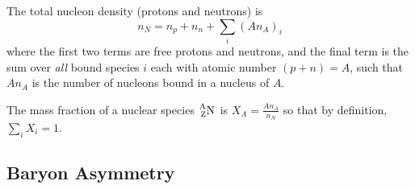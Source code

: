 \documentclass[a4paper,twoside,master.tex]{subfiles}
\begin{document}
The total nucleon density (protons and neutrons) is
\begin{equation}
    n_N = n_p + n_n + \sum_i (A n_A)_i
\end{equation}
where the first two terms are free protons and neutrons, and the final term is the sum over \textit{all} bound species $ i $ each with atomic number $ (p + n) = A $, such that $ A n_A $ is the number of nucleons bound in a nucleus of $ A $.

The mass fraction of a nuclear species $ \nuclide[A][Z]{N} $ is $ X_A = \frac{A n_A}{n_N} $ so that by definition, $ \sum_i X_i = 1 $.

\subsection{Baryon Asymmetry}\label{sub:baryon_asymmetry}
\end{document}
